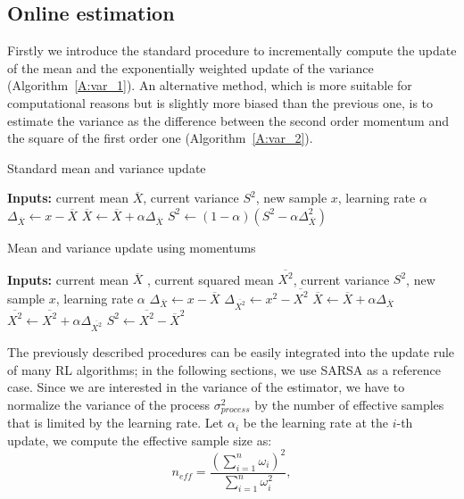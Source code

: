 \subsection{Online estimation}
Firstly we introduce the standard procedure to incrementally compute the update of the mean and the exponentially weighted update of the variance (Algorithm~\ref{A:var_1}). An alternative method, which is more suitable for computational reasons but is slightly more biased than the previous one, is to estimate the variance as the difference between the second order momentum and the square of the first order one (Algorithm~\ref{A:var_2}).
\begin{algorithm}[t]
 \caption{Standard mean and variance update}
 \begin{algorithmic}[1]\label{A:var_1}
  \STATE \textbf{Inputs:} current mean $\overline{X}$, current variance $S^2$, new sample $x$, learning rate $\alpha$
  \STATE $\Delta_{\overline{X}} \gets x - \overline{X}$
  \STATE $\overline{X} \gets \overline{X} + \alpha \Delta_{\overline{X}}$
  \STATE $S^2 \gets (1 - \alpha)(S^2 - \alpha \Delta_{\overline{X}}^2)$
 \end{algorithmic}
\end{algorithm}
\begin{algorithm}[t]
 \caption{Mean and variance update using momentums}
 \begin{algorithmic}[1]\label{A:var_2}
  \STATE \textbf{Inputs:} current mean $\overline{X}$ , current squared mean $\overline{X^2}$, current variance $S^2$, new sample $x$, learning rate $\alpha$
  \STATE $\Delta_{\overline{X}} \gets x - \overline{X}$
  \STATE $\Delta_{\overline{X^2}} \gets x^2 - \overline{X^2}$
  \STATE $\overline{X} \gets \overline{X} + \alpha \Delta_{\overline{X}}$
  \STATE $\overline{X^2} \gets \overline{X^2} + \alpha \Delta_{\overline{X^2}}$
  \STATE $S^2 \gets \overline{X^2} - \overline{X}^2$
 \end{algorithmic}
\end{algorithm}
The previously described procedures can be easily integrated into the update rule of many RL algorithms; in the following sections, we use SARSA as a reference case. Since we are interested in the variance of the estimator, we have to normalize the variance of the process $\sigma^2_{process}$ by the number of effective samples that is limited by the learning rate. Let $\alpha_i$ be the learning rate at the $i$-th update, we compute the effective sample size as:
\begin{equation}
 n_{eff} = \frac{(\sum_{i=1}^n \omega_i)^2}{\sum_{i=1}^n \omega_i^2},
\end{equation}
